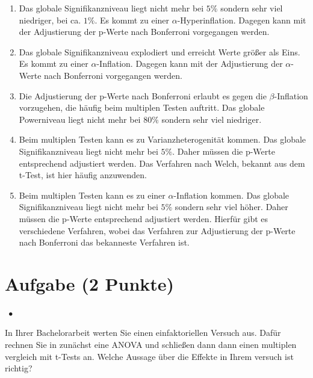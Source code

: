 \documentclass[a4paper, 9pt]{scrartcl}\usepackage[]{graphicx}\usepackage[]{xcolor}
\begin{document}
\begin{enumerate}
\item [\textbf{A} \msquare] Das globale Signifikanzniveau liegt nicht mehr bei $5\%$ sondern sehr viel niedriger, bei ca. $1\%$. Es kommt zu einer $\alpha$-Hyperinflation. Dagegen kann mit der Adjustierung der p-Werte nach Bonferroni vorgegangen werden.
\item [\textbf{B} \msquare] Das globale Signifikanzniveau explodiert und erreicht Werte größer als Eins. Es kommt zu einer $\alpha$-Inflation. Dagegen kann mit der Adjustierung der $\alpha$-Werte nach Bonferroni vorgegangen werden.
\item [\textbf{C} \msquare] Die Adjustierung der p-Werte nach Bonferroni erlaubt es gegen die $\beta$-Inflation vorzugehen, die häufig beim multiplen Testen auftritt. Das globale Powerniveau liegt nicht mehr bei $80\%$ sondern sehr viel niedriger.
\item [\textbf{D} \msquare] Beim multiplen Testen kann es zu Varianzheterogenität kommen. Das globale Signifikanzniveau liegt nicht mehr bei $5\%$. Daher müssen die p-Werte entsprechend adjustiert werden. Das Verfahren nach Welch, bekannt aus dem t-Test, ist hier häufig anzuwenden.
\item [\textbf{E} \msquare] Beim multiplen Testen kann es zu einer $\alpha$-Inflation kommen. Das globale Signifikanzniveau liegt nicht mehr bei $5\%$ sondern sehr viel höher. Daher müssen die p-Werte entsprechend adjustiert werden. Hierfür gibt es verschiedene Verfahren, wobei das Verfahren zur Adjustierung der p-Werte nach Bonferroni das bekanneste Verfahren ist.
\end{enumerate}

\section{Aufgabe \hfill (2 Punkte)}

\ifcollection
\begin{flushright}
\tiny\vspace{-2Ex}
\textbf{\examinhaltstart}
\exammodulestatversuch $\;\bullet$
\exammodulebiostat
\vspace{-1Ex}
\end{flushright}
\fi




In Ihrer Bachelorarbeit werten Sie einen einfaktoriellen Versuch aus. Dafür rechnen Sie in \Rlogo zunächst eine ANOVA und schließen dann dann einen multiplen vergleich mit t-Tests an. Welche Aussage über die Effekte in Ihrem versuch ist richtig?
\end{document}
